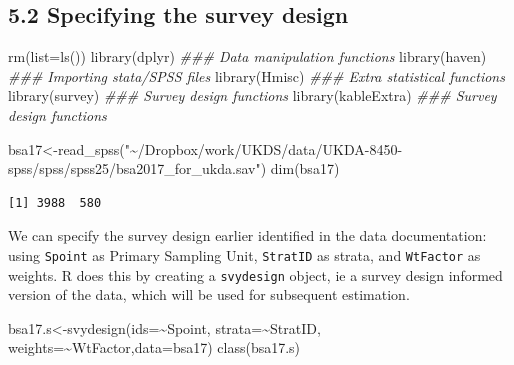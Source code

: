 \documentclass[
  14,
  a4paper,
  DIV=11,
  numbers=noendperiod]{scrartcl}
\newenvironment{Shaded}{\begin{snugshade}}{\end{snugshade}}
\newcommand{\AttributeTok}[1]{\textcolor[rgb]{0.40,0.45,0.13}{#1}}
\newcommand{\DocumentationTok}[1]{\textcolor[rgb]{0.37,0.37,0.37}{\textit{#1}}}
\newcommand{\FunctionTok}[1]{\textcolor[rgb]{0.28,0.35,0.67}{#1}}
\newcommand{\NormalTok}[1]{\textcolor[rgb]{0.00,0.23,0.31}{#1}}
\newcommand{\OtherTok}[1]{\textcolor[rgb]{0.00,0.23,0.31}{#1}}
\newcommand{\SpecialCharTok}[1]{\textcolor[rgb]{0.37,0.37,0.37}{#1}}
\newcommand{\StringTok}[1]{\textcolor[rgb]{0.13,0.47,0.30}{#1}}
\begin{document}
\hypertarget{specifying-the-survey-design}{%
\subsection{5.2 Specifying the survey
design}\label{specifying-the-survey-design}}

\begin{Shaded}
\begin{Highlighting}[]
\FunctionTok{rm}\NormalTok{(}\AttributeTok{list=}\FunctionTok{ls}\NormalTok{())}
\FunctionTok{library}\NormalTok{(dplyr) }\DocumentationTok{\#\#\# Data manipulation functions}
\FunctionTok{library}\NormalTok{(haven) }\DocumentationTok{\#\#\# Importing stata/SPSS files}
\FunctionTok{library}\NormalTok{(Hmisc) }\DocumentationTok{\#\#\# Extra statistical functions}
\FunctionTok{library}\NormalTok{(survey) }\DocumentationTok{\#\#\# Survey design functions}
\FunctionTok{library}\NormalTok{(kableExtra) }\DocumentationTok{\#\#\# Survey design functions}

\NormalTok{bsa17}\OtherTok{\textless{}{-}}\FunctionTok{read\_spss}\NormalTok{(}\StringTok{"\textasciitilde{}/Dropbox/work/UKDS/data/UKDA{-}8450{-}spss/spss/spss25/bsa2017\_for\_ukda.sav"}\NormalTok{)}
\FunctionTok{dim}\NormalTok{(bsa17)}
\end{Highlighting}
\end{Shaded}

\begin{verbatim}
[1] 3988  580
\end{verbatim}

We can specify the survey design earlier identified in the data
documentation: using \texttt{Spoint} as Primary Sampling Unit,
\texttt{StratID} as strata, and \texttt{WtFactor} as weights. R does
this by creating a \texttt{svydesign} object, ie a survey design
informed version of the data, which will be used for subsequent
estimation.

\begin{Shaded}
\begin{Highlighting}[]
\NormalTok{bsa17.s}\OtherTok{\textless{}{-}}\FunctionTok{svydesign}\NormalTok{(}\AttributeTok{ids=}\SpecialCharTok{\textasciitilde{}}\NormalTok{Spoint, }\AttributeTok{strata=}\SpecialCharTok{\textasciitilde{}}\NormalTok{StratID, }\AttributeTok{weights=}\SpecialCharTok{\textasciitilde{}}\NormalTok{WtFactor,}\AttributeTok{data=}\NormalTok{bsa17)}
\FunctionTok{class}\NormalTok{(bsa17.s)}
\end{Highlighting}
\end{Shaded}
\end{document}
